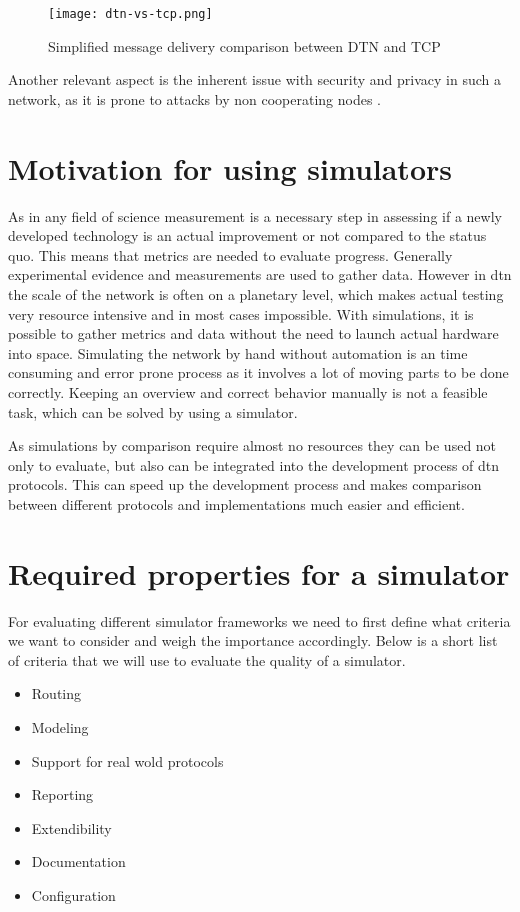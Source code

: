 \documentclass{tudscrartcl}
\newcommand{\dtn}{
  \ac{dtn}
}
\begin{document}
\begin{figure}[h]
  \label{fig:dtn-vs-tcp}
  \caption{Simplified message delivery comparison between DTN and TCP}
  \centering
  \texttt{[image: dtn-vs-tcp.png]}
\end{figure}

Another relevant aspect is the inherent issue with security and privacy in such a network, as it is prone to attacks by non cooperating nodes \cite{jedari2018survey}.

\section{Motivation for using simulators}

As in any field of science measurement is a necessary step in assessing if a newly developed technology is an actual improvement or not compared to the status quo. This means that metrics are needed to evaluate progress. Generally experimental evidence and measurements are used to gather data.
However in \dtn the scale of the network is often on a planetary level, which makes actual testing very resource intensive and in most cases impossible. With simulations, it is possible to gather metrics and data without the need to launch actual hardware into space.
Simulating the network by hand without automation is an time consuming and error prone process as it involves a lot of moving parts to be done correctly. Keeping an overview and correct behavior manually is not a feasible task, which can be solved by using a simulator.

As simulations by comparison require almost no resources they can be used not only to evaluate, but also can be integrated into the development process of \dtn protocols. This can speed up the development process and makes comparison between different protocols and implementations much easier and efficient.

\section{Required properties for a simulator}

For evaluating different simulator frameworks we need to first define what criteria we want to consider and weigh the importance accordingly. Below is a short list of criteria that we will use to evaluate the quality of a simulator.

\begin{itemize}
  \item Routing
  \item Modeling
  \item Support for real wold protocols
  \item Reporting
  \item Extendibility
  \item Documentation
  \item Configuration
\end{itemize}
\end{document}
